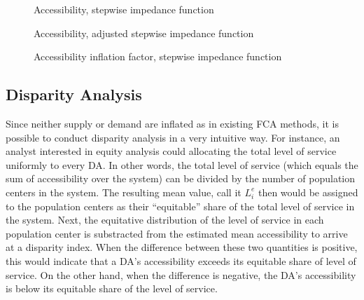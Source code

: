 \documentclass[10pt,letterpaper]{article}
\begin{document}
\begin{figure}[htbp]
\centering
\caption{\label{fig:fig11-map-accessibility-stepwise}Accessibility,
stepwise impedance function}
\end{figure}

\begin{figure}[htbp]
\centering
\caption{\label{fig:fig12-map-accessibility-stepwise-adjusted}Accessibility,
adjusted stepwise impedance function}
\end{figure}

\begin{figure}[htbp]
\centering
\caption{\label{fig:fig13-map-accessibility-stepwise-comparison}Accessibility
inflation factor, stepwise impedance function}
\end{figure}

\subsection{Disparity Analysis}\label{disparity-analysis}

Since neither supply or demand are inflated as in existing FCA methods,
it is possible to conduct disparity analysis in a very intuitive way.
For instance, an analyst interested in equity analysis could allocating
the total level of service uniformly to every DA. In other words, the
total level of service (which equals the sum of accessibility over the
system) can be divided by the number of population centers in the
system. The resulting mean value, call it \(L_i^e\) then would be
assigned to the population centers as their ``equitable'' share of the
total level of service in the system. Next, the equitative distribution
of the level of service in each population center is substracted from
the estimated mean accessibility to arrive at a disparity index. When
the difference between these two quantities is positive, this would
indicate that a DA's accessibility exceeds its equitable share of level
of service. On the other hand, when the difference is negative, the DA's
accessibility is below its equitable share of the level of service.
\end{document}
